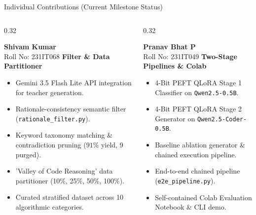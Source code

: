\documentclass[aspectratio=169,10pt]{beamer}
\begin{document}
\begin{frame}{Individual Contributions (Current Milestone Status)}
\begin{columns}[T]
    \begin{column}{0.32\textwidth}
      \begin{block}{\textbf{Shivam Kumar}\\[1pt]\scriptsize Roll No: 231IT068}
        \textbf{Filter \& Data Partitioner}
        \vspace{3pt}
        \begin{itemize}\itemsep=2.5pt\footnotesize
          \item Gemini 3.5 Flash Lite API integration for teacher generation.
          \item Rationale-consistency semantic filter (\texttt{rationale\_filter.py}).
          \item Keyword taxonomy matching \& contradiction pruning ($91\%$ yield, 9 purged).
          \item 'Valley of Code Reasoning' data partitioner (10\%, 25\%, 50\%, 100\%).
          \item Curated stratified dataset across 10 algorithmic categories.
        \end{itemize}
      \end{block}
    \end{column}

    \begin{column}{0.32\textwidth}
      \begin{block}{\textbf{Pranav Bhat P}\\[1pt]\scriptsize Roll No: 231IT049}
        \textbf{Two-Stage Pipelines \& Colab}
        \vspace{3pt}
        \begin{itemize}\itemsep=2.5pt\footnotesize
          \item 4-Bit PEFT QLoRA Stage 1 Classifier on \texttt{Qwen2.5-0.5B}.
          \item 4-Bit PEFT QLoRA Stage 2 Generator on \texttt{Qwen2.5-Coder-0.5B}.
          \item Baseline ablation generator \& chained execution pipeline.
          \item End-to-end chained pipeline (\texttt{e2e\_pipeline.py}).
          \item Self-contained Colab Evaluation Notebook \& CLI demo.
        \end{itemize}
      \end{block}
    \end{column}
  \end{columns}
\end{frame}
\end{document}

